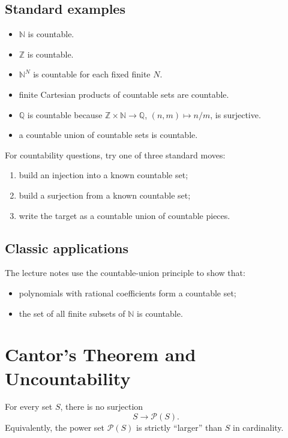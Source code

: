\documentclass[11pt,a4paper]{article}
\newcommand{\N}{\mathbb{N}}
\newcommand{\Z}{\mathbb{Z}}
\newcommand{\Q}{\mathbb{Q}}
\newcommand{\PP}{\mathcal{P}}
\begin{document}
\subsection{Standard examples}
\begin{itemize}
\item $\N$ is countable.
\item $\Z$ is countable.
\item $\N^N$ is countable for each fixed finite $N$.
\item finite Cartesian products of countable sets are countable.
\item $\Q$ is countable because $\Z\times\N\to\Q$, $(n,m)\mapsto n/m$, is surjective.
\item a countable union of countable sets is countable.
\end{itemize}

\begin{exambox}
For countability questions, try one of three standard moves:
\begin{enumerate}
\item build an injection into a known countable set;
\item build a surjection from a known countable set;
\item write the target as a countable union of countable pieces.
\end{enumerate}
\end{exambox}

\subsection{Classic applications}
The lecture notes use the countable-union principle to show that:
\begin{itemize}
\item polynomials with rational coefficients form a countable set;
\item the set of all finite subsets of $\N$ is countable.
\end{itemize}

\section{Cantor's Theorem and Uncountability}

\begin{theorembox}
For every set $S$, there is no surjection
\[
S\to\PP(S).
\]
Equivalently, the power set $\PP(S)$ is strictly ``larger'' than $S$ in cardinality.
\end{theorembox}
\end{document}
